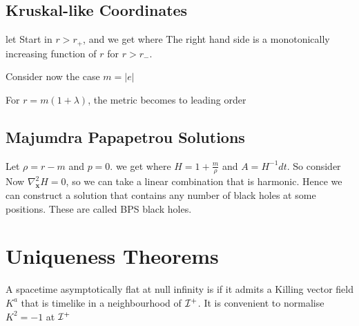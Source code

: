 \documentclass{article}
\begin{document}
\subsection{Kruskal-like Coordinates }

let 
Start in $r> r_+$, and we get 
where 
The right hand side is a monotonically increasing function of $r$ for $r > r_-$. 


Consider now the case $m = |e|$

For $r = m(1 + \lambda)$, the metric becomes 
to leading order

\subsection{Majumdra Papapetrou Solutions }
Let $\rho = r-m$ and $p=0$. we get 
where $H = 1 + \frac{m}{\rho}$ and $A = H^{-1}dt$. So consider
Now $\nabla_{\bm{x}}^2 H = 0$, so we can take 
a linear combination that is harmonic. Hence we can construct a solution that contains any number of black holes at some positions. These are called BPS black holes. 

\section{Uniqueness Theorems}
\begin{definition}
A spacetime asymptotically flat at null infinity is  if it admits a Killing vector field $K^a$ that is timelike in a neighbourhood of $\mathcal{I}^+$. It is convenient to normalise $K^2 = -1$ at $\mathcal{I}^+$
\end{definition}
\end{document}
